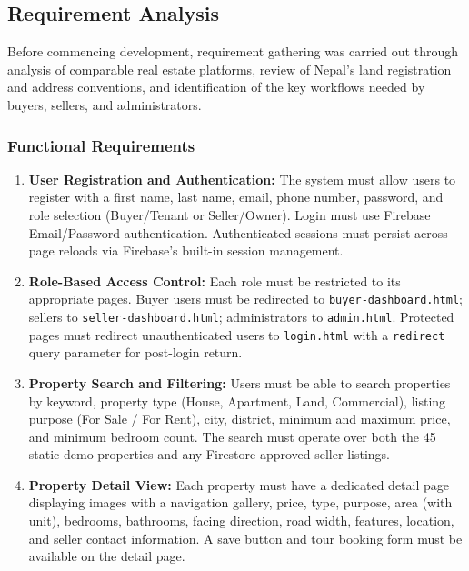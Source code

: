 \documentclass[12pt,a4paper]{report}
\begin{document}
\subsection{Requirement Analysis}

Before commencing development, requirement gathering was carried out through
analysis of comparable real estate platforms, review of Nepal's land registration
and address conventions, and identification of the key workflows needed by buyers,
sellers, and administrators.

\subsubsection{Functional Requirements}

\begin{enumerate}[leftmargin=2.5em]
  \item \textbf{User Registration and Authentication:}
    The system must allow users to register with a first name, last name, email,
    phone number, password, and role selection (Buyer/Tenant or Seller/Owner).
    Login must use Firebase Email/Password authentication. Authenticated sessions
    must persist across page reloads via Firebase's built-in session management.

  \item \textbf{Role-Based Access Control:}
    Each role must be restricted to its appropriate pages. Buyer users must be
    redirected to \texttt{buyer-dashboard.html}; sellers to
    \texttt{seller-dashboard.html}; administrators to \texttt{admin.html}.
    Protected pages must redirect unauthenticated users to \texttt{login.html}
    with a \texttt{redirect} query parameter for post-login return.

  \item \textbf{Property Search and Filtering:}
    Users must be able to search properties by keyword, property type
    (House, Apartment, Land, Commercial), listing purpose (For Sale / For Rent),
    city, district, minimum and maximum price, and minimum bedroom count.
    The search must operate over both the 45 static demo properties and any
    Firestore-approved seller listings.

  \item \textbf{Property Detail View:}
    Each property must have a dedicated detail page displaying images with a
    navigation gallery, price, type, purpose, area (with unit), bedrooms,
    bathrooms, facing direction, road width, features, location, and seller
    contact information. A save button and tour booking form must be available
    on the detail page.


\end{enumerate}
\end{document}
